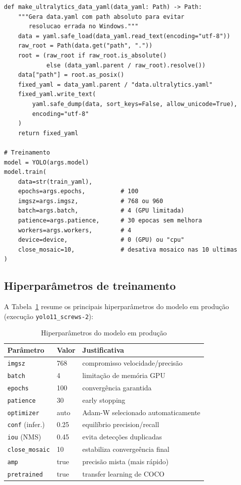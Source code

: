 \documentclass[12pt,a4paper]{article}
\begin{document}
\begin{lstlisting}[caption={Trecho do script de treinamento (\texttt{train\_screws\_yolo.py})}]
def make_ultralytics_data_yaml(data_yaml: Path) -> Path:
    """Gera data.yaml com path absoluto para evitar
       resolucao errada no Windows."""
    data = yaml.safe_load(data_yaml.read_text(encoding="utf-8"))
    raw_root = Path(data.get("path", "."))
    root = (raw_root if raw_root.is_absolute()
            else (data_yaml.parent / raw_root).resolve())
    data["path"] = root.as_posix()
    fixed_yaml = data_yaml.parent / "data.ultralytics.yaml"
    fixed_yaml.write_text(
        yaml.safe_dump(data, sort_keys=False, allow_unicode=True),
        encoding="utf-8"
    )
    return fixed_yaml

# Treinamento
model = YOLO(args.model)
model.train(
    data=str(train_yaml),
    epochs=args.epochs,          # 100
    imgsz=args.imgsz,            # 768 ou 960
    batch=args.batch,            # 4 (GPU limitada)
    patience=args.patience,      # 30 epocas sem melhora
    workers=args.workers,        # 4
    device=device,               # 0 (GPU) ou "cpu"
    close_mosaic=10,             # desativa mosaico nas 10 ultimas
)
\end{lstlisting}

\subsection{Hiperpar\^ametros de treinamento}

A Tabela~\ref{tab:hiper} resume os principais hiperpar\^ametros do modelo em produ\c{c}\~ao
(execu\c{c}\~ao \texttt{yolo11\_screws-2}):

\begin{table}[H]
  \centering
  \caption{Hiperpar\^ametros do modelo em produ\c{c}\~ao}
  \label{tab:hiper}
  \begin{tabular}{lll}
    \toprule
    \textbf{Par\^ametro} & \textbf{Valor} & \textbf{Justificativa} \\
    \midrule
    \texttt{imgsz}         & 768    & compromisso velocidade/precis\~ao \\
    \texttt{batch}         & 4      & limita\c{c}\~ao de mem\'oria GPU \\
    \texttt{epochs}        & 100    & converg\^encia garantida \\
    \texttt{patience}      & 30     & early stopping \\
    \texttt{optimizer}     & auto   & Adam-W selecionado automaticamente \\
    \texttt{conf} (infer.) & 0.25   & equil\'ibrio precision/recall \\
    \texttt{iou} (NMS)     & 0.45   & evita detec\c{c}\~oes duplicadas \\
    \texttt{close\_mosaic} & 10     & estabiliza converge\^encia final \\
    \texttt{amp}           & true   & precis\~ao mista (mais r\'apido) \\
    \texttt{pretrained}    & true   & transfer learning de COCO \\
    \bottomrule
  \end{tabular}
\end{table}
\end{document}
